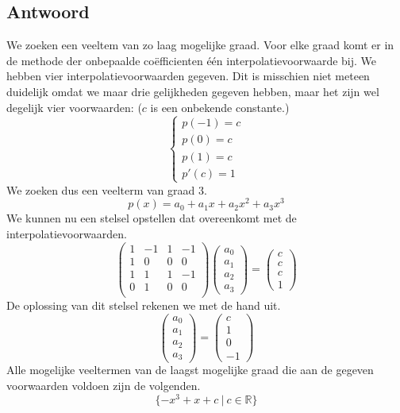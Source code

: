 \documentclass[examenvragen.tex]{subfiles}
\begin{document}
\subsection{Antwoord}
We zoeken een veeltem van zo laag mogelijke graad. Voor elke graad komt er in de methode der onbepaalde co\"efficienten \'e\'en interpolatievoorwaarde bij. We hebben vier interpolatievoorwaarden gegeven. Dit is misschien niet meteen duidelijk omdat we maar drie gelijkheden gegeven hebben, maar het zijn wel degelijk vier voorwaarden: ($c$ is een onbekende constante.)
\[
\left\{
\begin{array}{c}
p(-1) = c\\
p(0) = c\\
p(1) = c\\
p'(c) = 1
\end{array}
\right.
\]
We zoeken dus een veelterm van graad $3$.
\[
p(x) = a_0 + a_1x + a_2x^2 + a_3x^3
\]
We kunnen nu een stelsel opstellen dat overeenkomt met de interpolatievoorwaarden.
\[
\begin{pmatrix}
1 & -1 & 1 & -1\\
1&0&0&0\\
1 & 1 & 1 & -1\\
0&1&0&0\\
\end{pmatrix}
\begin{pmatrix}
a_0\\a_1\\a_2\\a_3
\end{pmatrix}
=
\begin{pmatrix}
c\\c\\c\\1
\end{pmatrix}
\]
De oplossing van dit stelsel rekenen we met de hand uit.
\[
\begin{pmatrix}
a_0\\a_1\\a_2\\a_3
\end{pmatrix}
=
\begin{pmatrix}
c \\1\\ 0\\ -1
\end{pmatrix}
\]
Alle mogelijke veeltermen van de laagst mogelijke graad die aan de gegeven voorwaarden voldoen zijn de volgenden.
\[
\{ -x^3 + x + c \ |\ c \in \mathbb{R}\}
\]
\end{document}
